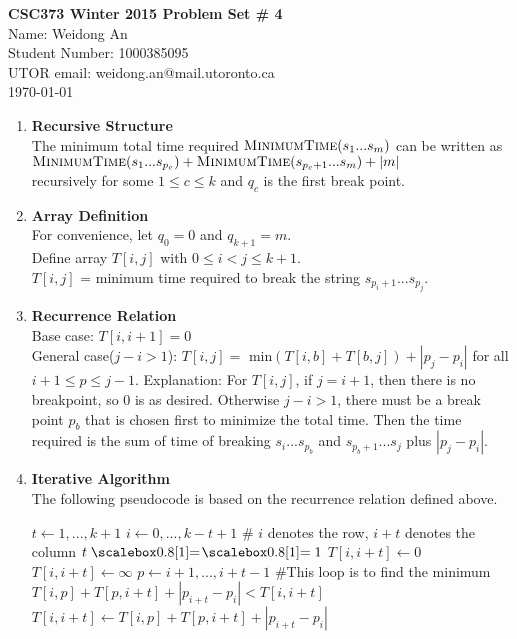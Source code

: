 \documentclass[11pt]{article}
\begin{document}
\begin{center}
{\bf \Large \bf CSC373 Winter 2015 Problem Set \# 4}\\
Name: Weidong An\\
Student Number: 1000385095\\
UTOR email: weidong.an@mail.utoronto.ca\\
\today\\
\end{center}

\begin{enumerate}[label=(\alph*)]

\item {\bf Recursive Structure}\\
The minimum total time required $\textnormal{\scshape MinimumTime}(s_1...s_m)$ can be written as \\$\textnormal{\scshape MinimumTime}(s_{1}...s_{p_c}) + \textnormal{\scshape MinimumTime}(s_{p_c+1}...s_{m}) + |m|$ \\recursively for some $1 \leq c \leq k$ and $q_c$ is the first break point.

\item {\bf Array Definition}\\
For convenience, let $q_0 = 0$ and $q_{k+1} = m$.\\
Define array $T[i, j]$ with $0 \leq i < j \leq k +1$.\\
$T[i, j]$ = minimum time required to break the string $s_{p_i+1}...s_{p_j}$.

\item {\bf Recurrence Relation}\\
Base case: $T[i, i + 1] = 0$\\
General case($j - i > 1$): $T[i, j] = $ min$(T[i, b] + T[b, j]) + |p_j- p_i|$ for all $i + 1 \leq p \leq j-1$.
Explanation: For $T[i, j]$, if $j = i + 1$, then there is no breakpoint, so 0 is as desired. Otherwise $j - i > 1$, there must be a break point $p_b$ that is chosen first to minimize the total time. Then the time required is the sum of time of breaking $s_i...s_{p_b}$ and $s_{p_b+1}...s_j$ plus $|p_j - p_i|$.\\

\item {\bf Iterative Algorithm}\\
The following pseudocode is based on the recurrence relation defined above.
\begin{codebox}
\li \For $t \gets 1, ..., k+1$
\li     \Then \For $i \gets 0, ..., k-t+1$ $\#$ $i$ denotes the row, $i + t$ denotes the column
\li               \Then \If $t \isequal 1$
\li                        \Then $T[i, i + t] \gets 0$
\li                     \Else
\li                          $T[i, i + t] \gets \infty$
\li                          \For $p \gets i + 1, ..., i+t-1$ $\#$This loop is to find the minimum
\li                               \Then \If $T[i, p] + T[p, i +t] + |p_{i + t}- p_i| < T[i, i + t]$
\li                                         \Then $T[i, i + t] \gets T[i, p] + T[p, i +t] + |p_{i + t}- p_i|$


\end{codebox}
\end{enumerate}
\end{document}
